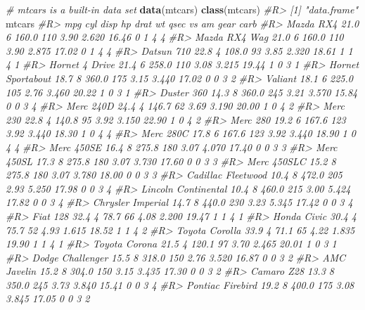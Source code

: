 \documentclass[]{book}
\newenvironment{Shaded}{}{}
\newcommand{\CommentTok}[1]{\textcolor[rgb]{0.38,0.63,0.69}{\textit{#1}}}
\newcommand{\KeywordTok}[1]{\textcolor[rgb]{0.00,0.44,0.13}{\textbf{#1}}}
\newcommand{\NormalTok}[1]{#1}
\theoremstyle{definition}
\theoremstyle{definition}
\theoremstyle{definition}
\theoremstyle{remark}
\begin{document}
\begin{Shaded}
\begin{Highlighting}[]
\CommentTok{# mtcars is a built-in data set}
\KeywordTok{data}\NormalTok{(mtcars)}
\KeywordTok{class}\NormalTok{(mtcars)}
\CommentTok{#R> [1] "data.frame"}
\NormalTok{mtcars}
\CommentTok{#R>                      mpg cyl  disp  hp drat    wt  qsec vs am gear carb}
\CommentTok{#R> Mazda RX4           21.0   6 160.0 110 3.90 2.620 16.46  0  1    4    4}
\CommentTok{#R> Mazda RX4 Wag       21.0   6 160.0 110 3.90 2.875 17.02  0  1    4    4}
\CommentTok{#R> Datsun 710          22.8   4 108.0  93 3.85 2.320 18.61  1  1    4    1}
\CommentTok{#R> Hornet 4 Drive      21.4   6 258.0 110 3.08 3.215 19.44  1  0    3    1}
\CommentTok{#R> Hornet Sportabout   18.7   8 360.0 175 3.15 3.440 17.02  0  0    3    2}
\CommentTok{#R> Valiant             18.1   6 225.0 105 2.76 3.460 20.22  1  0    3    1}
\CommentTok{#R> Duster 360          14.3   8 360.0 245 3.21 3.570 15.84  0  0    3    4}
\CommentTok{#R> Merc 240D           24.4   4 146.7  62 3.69 3.190 20.00  1  0    4    2}
\CommentTok{#R> Merc 230            22.8   4 140.8  95 3.92 3.150 22.90  1  0    4    2}
\CommentTok{#R> Merc 280            19.2   6 167.6 123 3.92 3.440 18.30  1  0    4    4}
\CommentTok{#R> Merc 280C           17.8   6 167.6 123 3.92 3.440 18.90  1  0    4    4}
\CommentTok{#R> Merc 450SE          16.4   8 275.8 180 3.07 4.070 17.40  0  0    3    3}
\CommentTok{#R> Merc 450SL          17.3   8 275.8 180 3.07 3.730 17.60  0  0    3    3}
\CommentTok{#R> Merc 450SLC         15.2   8 275.8 180 3.07 3.780 18.00  0  0    3    3}
\CommentTok{#R> Cadillac Fleetwood  10.4   8 472.0 205 2.93 5.250 17.98  0  0    3    4}
\CommentTok{#R> Lincoln Continental 10.4   8 460.0 215 3.00 5.424 17.82  0  0    3    4}
\CommentTok{#R> Chrysler Imperial   14.7   8 440.0 230 3.23 5.345 17.42  0  0    3    4}
\CommentTok{#R> Fiat 128            32.4   4  78.7  66 4.08 2.200 19.47  1  1    4    1}
\CommentTok{#R> Honda Civic         30.4   4  75.7  52 4.93 1.615 18.52  1  1    4    2}
\CommentTok{#R> Toyota Corolla      33.9   4  71.1  65 4.22 1.835 19.90  1  1    4    1}
\CommentTok{#R> Toyota Corona       21.5   4 120.1  97 3.70 2.465 20.01  1  0    3    1}
\CommentTok{#R> Dodge Challenger    15.5   8 318.0 150 2.76 3.520 16.87  0  0    3    2}
\CommentTok{#R> AMC Javelin         15.2   8 304.0 150 3.15 3.435 17.30  0  0    3    2}
\CommentTok{#R> Camaro Z28          13.3   8 350.0 245 3.73 3.840 15.41  0  0    3    4}
\CommentTok{#R> Pontiac Firebird    19.2   8 400.0 175 3.08 3.845 17.05  0  0    3    2}

\end{Highlighting}
\end{Shaded}
\end{document}
